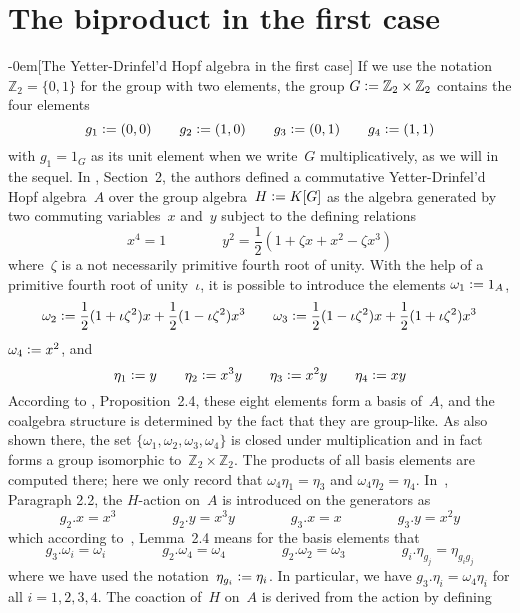 \documentclass{article}
\makeatletter
\renewcommand{\subsection}{\@startsection{subsection}{2}{0em}%
{\baselineskip}{-0em}{\bfseries\normalsize}}
\numberwithin{equation}{section}
\theoremstyle{definition}
\theoremstyle{break}
\newcommand{\deq}{\vcentcolon =}
\newcommand{\ua}{1_A}
\newcommand{\K}{1}
\newcommand{\1}{{(1)}}
\newcommand{\2}{{(2)}}
\newcommand{\3}{{(3)}}
\newcommand{\Z}{{\mathbb Z}}
\makeatother
\begin{document}
\section{The biproduct in the first case} \label{Sec:BiprodFirst}
\subsection[The Yetter-Drinfel'd Hopf algebra in the first case]{} \label{YetDrinfFirst}
If we use the notation~$\Z_2 = \{0,1\}$ for the group with two elements, the group
$G \deq \Z_2 \times \Z_2$ contains the four elements
\[g_1 \deq (0,0) \qquad g_2 \deq (1,0) \qquad g_3 \deq (0,1) \qquad  g_4 \deq (1,1)\]
with $g_1 = 1_G$ as its unit element when we write~$G$ multiplicatively, as we will in the sequel.
In \cite{KaSo2}, Section~2, the authors defined a commutative Yetter-Drinfel'd Hopf algebra~$A$ over the group algebra~$H \deq K[G]$ as the algebra generated by two commuting variables~$x$ and~$y$ subject to the defining relations
\[x^4 = 1 \qquad \qquad y^2 = \frac{1}{2}(1 + \zeta x + x^2 - \zeta x^3)\]
where~$\zeta$ is a not necessarily primitive fourth root of unity. With the help of a primitive fourth root of unity~$\iota$, it is possible to introduce the elements $\omega_1 \deq \ua$,
\[\omega_2 \deq \frac{\K}{2}(1 + \iota \zeta^2) x + \frac{\K}{2}(1 - \iota \zeta^2) x^3 \qquad
\omega_3 \deq \frac{\K}{2}(1 - \iota \zeta^2) x + \frac{\K}{2}(1 + \iota \zeta^2) x^3\]
$\omega_4 \deq x^2$, and
\[\eta_1 \deq y \qquad \eta_2 \deq x^3 y \qquad \eta_3 \deq x^2 y \qquad \eta_4 \deq x y\]
According to \cite{KaSo2}, Proposition~2.4, these eight elements form a basis of~$A$, and the coalgebra structure is determined by the fact that they are group-like. As also shown there, the set $\{\omega_1 , \omega_2, \omega_3, \omega_4\}$ is closed under multiplication and in fact forms a group isomorphic
to~$\Z_2 \times \Z_2$. The products of all basis elements are computed there; here we only record that $\omega_4 \eta_1 = \eta_3$ and $\omega_4 \eta_2 = \eta_4$. In~\cite{KaSo2}, Paragraph 2.2, the 
$H$-action on~$A$ is introduced on the generators as
\[g_2.x = x^3 \qquad \qquad g_2.y = x^3 y \qquad \qquad
g_3.x = x \qquad \qquad g_3.y = x^2 y\]
which according to~\cite{KaSo2}, Lemma~2.4 means for the basis elements that
\[g_3.\omega_i = \omega_i \qquad \qquad  g_2.\omega_4 = \omega_4 \qquad \qquad g_2.\omega_2 = \omega_3 \qquad \qquad  g_i.\eta_{g_j} = \eta_{g_i g_j}\]
where we have used the notation~$\eta_{g_i} \deq \eta_i$. In particular, we have
$g_3.\eta_i = \omega_4 \eta_i$ for all $i=1, 2, 3, 4$. The coaction of~$H$ on~$A$ is derived from the action by defining
\end{document}
